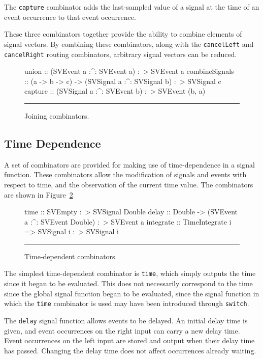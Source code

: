 The {\tt capture} combinator adds the last-sampled value of a signal at the time
of an event occurrence to that event occurrence.

These three combinators together provide the ability to combine elements of
signal vectors. By combining these combinators, along with the {\tt cancelLeft}
and {\tt cancelRight} routing combinators, arbitrary signal vectors can be
reduced.

\begin{figure}
\begin{code}
union          :: (SVEvent a :^: SVEvent a) :~> SVEvent a
combineSignals :: (a -> b -> c) -> (SVSignal a :^: SVSignal b) :~> SVSignal c
capture        :: (SVSignal a :^: SVEvent b) :~> SVEvent (b, a)
\end{code}
\hrule
\caption{Joining combinators.}
\label{figure:joining_combinators}
\end{figure}

\subsection{Time Dependence}
\label{subsection:System_Design_and_Interface-Signal_Functions-Time_Dependence}

A set of combinators are provided for making use of time-dependence in a signal
function. These combinators allow the modification of signals and events with
respect to time, and the observation of the current time value. The combinators
are shown in Figure~\ref{figure:time_combinators}

\begin{figure}
\begin{code}
time      :: SVEmpty :~> SVSignal Double
delay     :: Double -> (SVEvent a :^: SVEvent Double) :~> SVEvent a
integrate :: TimeIntegrate i => SVSignal i :~> SVSignal i
\end{code}
\hrule
\caption{Time-dependent combinators.}
\label{figure:time_combinators}
\end{figure}

The simplest time-dependent combinator is {\tt time}, which simply outputs
the time since it began to be evaluated. This does not necessarily correspond to
the time since the global signal function began to be evaluated, since the
signal function in which the {\tt time} combinator is used may have been
introduced through {\tt switch}.

The {\tt delay} signal function allows events to be delayed. An initial delay
time is given, and event occurrences on the right input can carry a new delay
time. Event occurrences on the left input are stored and output when their delay
time has passed. Changing the delay time does not affect occurrences already
waiting.

